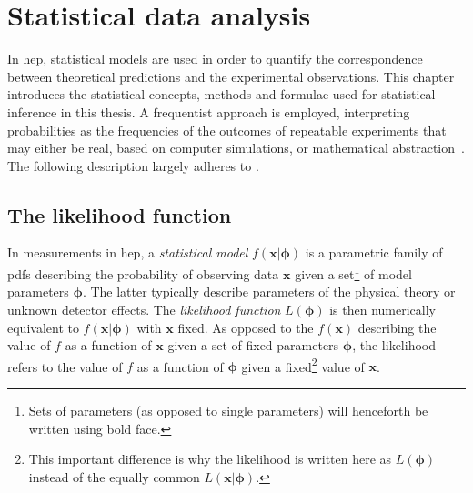 

\chapter{Statistical data analysis}\label{ch:statistics}

\ifpdf
    \graphicspath{{chapter-statistics/Figs/Raster/}{chapter-statistics/Figs/PDF/}{chapter-statistics/Figs/}}
\else
    \graphicspath{{chapter-statistics/Figs/Vector/}{chapter-statistics/Figs/}}
\fi

In \gls{hep}, statistical models are used in order to quantify the correspondence between theoretical predictions and the experimental observations.
This chapter introduces the statistical concepts, methods and formulae used for statistical inference in this thesis.
A frequentist approach is employed, interpreting probabilities as the frequencies of the outcomes of repeatable experiments that may either be real, based on computer simulations, or mathematical abstraction~\cite{pdg2020}.
The following description largely adheres to \cite{Cranmer:2015nia, Cowan:2010js}.

\section{The likelihood function}\label{sec:likelihood_function}
 
In measurements in \gls{hep}, a \textit{statistical model} $f(\boldsymbol{x}\vert\boldsymbol{\phi})$ is a parametric family of \glspl{pdf} describing the probability of observing data $\boldsymbol{x}$ given a set\footnote{Sets of parameters (as opposed to single parameters) will henceforth be written using bold face.} of model parameters $\boldsymbol{\phi}$.
The latter typically describe parameters of the physical theory or unknown detector effects. The \textit{likelihood function} $L(\boldsymbol{\phi})$ is then numerically equivalent to $f(\boldsymbol{x}\vert\boldsymbol{\phi})$ with $\boldsymbol{x}$ fixed.
As opposed to the  $f(\boldsymbol{x})$ describing the value of $f$ as a function of $\boldsymbol{x}$ given a set of fixed parameters $\boldsymbol{\phi}$, the likelihood refers to the value of $f$ as a function of $\boldsymbol{\phi}$ given a fixed\footnote{This important difference is why the likelihood is written here as $L(\boldsymbol{\phi})$ instead of the equally common $L(\boldsymbol{x}\vert\boldsymbol{\phi})$.} value of $\boldsymbol{x}$.


